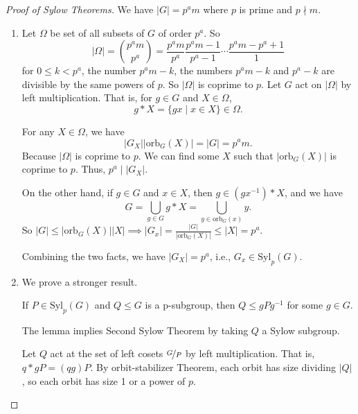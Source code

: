 \begin{proof}[Proof of Sylow Theorems]
    We have \(\left\vert G \right\vert = p^a m\) where \(p\) is prime and \(p\nmid m\).
    \begin{enumerate}
        \item Let \(\Omega\) be set of all subsets of \(G\) of order \(p^a\). So
        \[
            \left\vert \Omega \right\vert =\binom{p^a m}{p^a} = \frac{p^a m}{p^a} \frac{p^a m - 1}{p^a - 1}\cdots \frac{p^a m - p^a + 1}{1}
        \]
        for \(0 \leq k < p^a\), the number \(p^a m - k\), the numbers \(p^a m - k\) and \(p^a - k\) are divisible by the same powers of \(p\). So \(\left\vert \Omega \right\vert \) is coprime to \(p\). Let \(G\) act on \(\left\vert \Omega \right\vert \) by left multiplication. That is, for \(g \in G\) and \(X \in \Omega\),
        \[g * X = \{gx \mid x \in X\} \in \Omega.\]

        For any \(X \in \Omega\), we have
        \[
            \left\vert G_X \right\vert \left\vert \mathrm{orb}_G(X) \right\vert =\left\vert G \right\vert =p^a m.
        \]
        Because \(\left\vert \Omega \right\vert \) is coprime to \(p\). We can find some \(X\) such that \(\left\vert \mathrm{orb}_G(X) \right\vert \) is coprime to \(p\). Thus, \(p^a \mid \left\vert G_X \right\vert \).

        On the other hand, if \(g \in G\) and \(x \in X\), then \(g \in (gx^{-1})*X\), and we have
        \[
            G = \bigcup_{g\in G}g *X = \bigcup_{y\in \mathrm{orb}_G(x)}y.
        \]
        So \(\left\vert G \right\vert \leq  \left\vert \mathrm{orb}_G(X) \right\vert \left\vert X \right\vert\implies \left\vert G_x \right\vert = \frac{\left\vert G \right\vert}{\left\vert \mathrm{orb}_G(X) \right\vert} \leq \left\vert X \right\vert =p^a \).

        Combining the two facts, we have \(\left\vert G_X \right\vert =p^a\), i.e., \(G_x \in \mathrm{Syl}_p(G)\).
        \item We prove a stronger result.
        \begin{lemma}
            If \(P \in \mathrm{Syl}_p(G)\) and \(Q \leq G\) is a p-subgroup, then \(Q \leq gPg^{-1}\) for some \(g \in G\).
            \label{sylowp}
        \end{lemma}
        The lemma implies Second Sylow Theorem by taking \(Q\) a Sylow subgroup.

        Let \(Q\) act at the set of left cosets \(\nicefrac{G}{P}\) by left multiplication. That is, \(q * gP = (qg)P\). By orbit-stabilizer Theorem, each orbit has size dividing \(\left\vert Q \right\vert\), so each orbit has size 1 or a power of \(p\).


\end{enumerate}
\end{proof}
